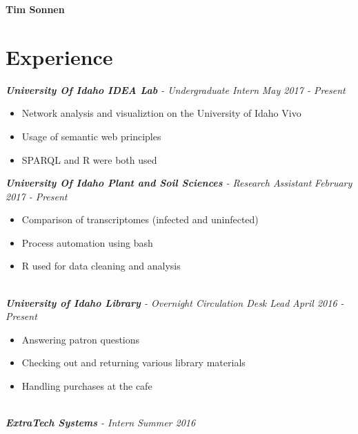 \documentclass[10pt]{article}
\begin{document}
\noindent
\centerline{\textbf{Tim Sonnen}}
\centerline{}
\section*{Experience}
  \vspace{2mm}
  \textit{\textbf{University Of Idaho IDEA Lab} - Undergraduate Intern} \hfill \textit{May 2017 - Present}
    \begin{adjustwidth}{5mm}{}
  	  \begin{itemize}[noitemsep,nolistsep]
        \item Network analysis and visualiztion on the University of Idaho Vivo
        \item Usage of semantic web principles
        \item SPARQL and R were both used
  	  \end{itemize}
  	\end{adjustwidth}
  \vspace{2mm}
  \textit{\textbf{University Of Idaho Plant and Soil Sciences} - Research Assistant} \hfill \textit{February 2017 - Present}
    \begin{adjustwidth}{5mm}{}
      \begin{itemize}[noitemsep,nolistsep]
        \item Comparison of transcriptomes (infected and uninfected)
        \item Process automation using bash
        \item R used for data cleaning and analysis
  	  \end{itemize}
    \end{adjustwidth}
  \vspace{2mm}
  \noindent
  \\ \textit{\textbf{University of Idaho Library} - Overnight Circulation Desk Lead} \hfill \textit{April 2016 - Present}   
    \begin{adjustwidth}{5mm}{}
      \begin{itemize}[noitemsep,nolistsep]
        \item Answering patron questions
        \item Checking out and returning various library materials
        \item Handling purchases at the cafe
  	  \end{itemize}
    \end{adjustwidth}
  \noindent
  \\ \textit{\textbf{ExtraTech Systems} - Intern} \hfill \textit{Summer 2016}
\end{document}

